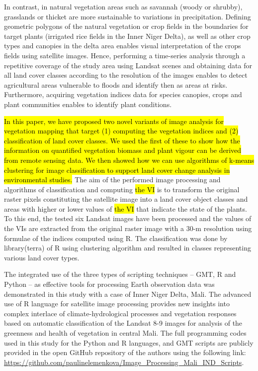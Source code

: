 \documentclass[12pt,a4paper,oneside]{article}
\def \newpar{\vspace{6pt}}
\begin{document}
\newpar In contrast, in natural vegetation areas such as savannah (woody or shrubby), grasslands or thicket are more sustainable to variations in precipitation. Defining geometric polygons of the natural vegetation or crop fields in the boundaries for target plants (irrigated rice fields in the Inner Niger Delta), as well as other crop types and canopies in the delta area enables visual interpretation of the crops fields using satellite images. Hence, performing a time-series analysis through a repetitive coverage of the study area using Landsat scenes and obtaining data for all land cover classes according to the resolution of the images enables to detect agricultural areas vulnerable to floods and identify then as areas at risks. Furthermore, acquiring vegetation indices data for species canopies, crops and plant communities enables to identify plant conditions.

\newpar \hl{In this paper, we have proposed two novel variants of image analysis for vegetation mapping that target (1) computing the vegetation indices and (2) classification of land cover classes. We used the first of these to show how the information on quantified vegetation biomass and plant vigour can be derived from remote sensing data. We then showed how we can use algorithms of k-means clustering for image classification to support land cover change analysis in environmental studies. }The aim of the performed image processing and algorithms of classification and computing \hl{the VI} is to transform the original raster pixels constituting the satellite image into a land cover object classes and areas with higher or lower values of \hl{the VI} that indicate the state of the plants. To this end, the tested six Landsat images have been processed and the values of the VIs are extracted from the original raster image with a 30-m resolution using formulae of the indices computed using R. The classification was done by library(terra) of R using clustering algorithm and resulted in classes representing various land cover types.

\newpar The integrated use of the three types of scripting techniques -- GMT, R and Python -- as effective tools for processing Earth observation data was demonstrated in this study with a case of Inner Niger Delta, Mali. The advanced use of R language for satellite image processing provides new insights into complex interlace of climate-hydrological processes and vegetation responses based on automatic classification of the Landsat 8-9 images for analysis of the greenness and health of vegetation in central Mali. The full programming codes used in this study for the Python and R languages, and GMT scripts are publicly provided in the open GitHub repository of the authors using the following link: \href{https://github.com/paulinelemenkova/Image_Processing_Mali_IND_Scripts}{https://github.com/paulinelemenkova/Image\_Processing\_Mali\_IND\_Scripts}. 
\end{document}
